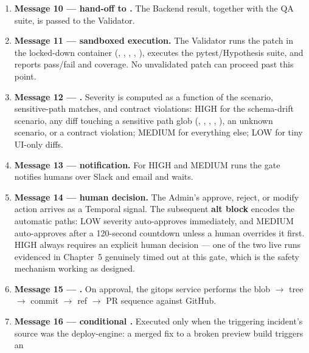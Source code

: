 \begin{enumerate}[itemsep=2pt]
        in the pipeline: CI/CD and ArgoCD manifests are prepared
        concurrently with the forward and reverse migration proposal, since
        neither depends on the other's output.
  \item \textbf{Message 10 --- hand-off to .} The
        Backend result, together with the QA suite, is passed to the
        Validator.
  \item \textbf{Message 11 --- sandboxed execution.} The Validator runs the
        patch in the locked-down container
        (, , ,
        , ),
        executes the pytest/Hypothesis suite, and reports pass/fail and
        coverage. No unvalidated patch can proceed past this point.
  \item \textbf{Message 12 --- .} Severity is
        computed as a function of the scenario, sensitive-path matches, and
        contract violations: HIGH for the schema-drift scenario, any diff
        touching a sensitive path glob (, ,
        , , ), an unknown
        scenario, or a contract violation; MEDIUM for everything else; LOW
        for tiny UI-only diffs.
  \item \textbf{Message 13 --- notification.} For HIGH and MEDIUM runs the
        gate notifies humans over Slack and email and waits.
  \item \textbf{Message 14 --- human decision.} The Admin's approve, reject,
        or modify action arrives as a Temporal signal. The subsequent
        \textbf{alt block} encodes the automatic paths: LOW severity
        auto-approves immediately, and MEDIUM auto-approves after a 120-second
        countdown unless a human overrides it first. HIGH always requires an
        explicit human decision --- one of the two live runs evidenced in
        Chapter~5 genuinely timed out at this gate, which is the safety
        mechanism working as designed.
  \item \textbf{Message 15 --- .} On approval, the gitops
        service performs the blob $\rightarrow$ tree $\rightarrow$ commit
        $\rightarrow$ ref $\rightarrow$ PR sequence against GitHub.
  \item \textbf{Message 16 --- conditional .}
        Executed only when the triggering incident's source was the
        deploy-engine: a merged fix to a broken preview build triggers an

\end{enumerate}
